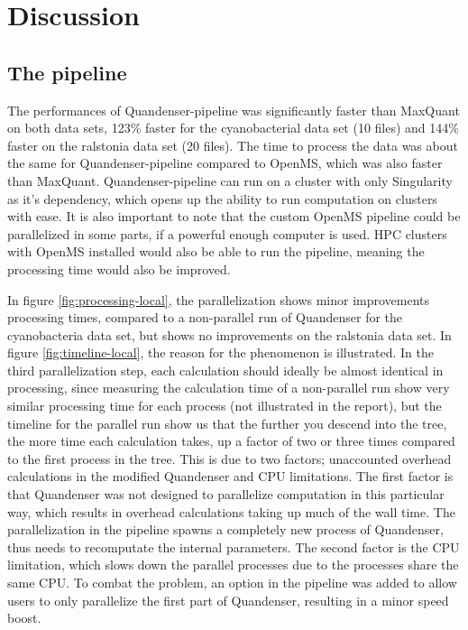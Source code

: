 \section{Discussion}

\subsection{The pipeline}
The performances of Quandenser-pipeline was significantly faster than MaxQuant on both data sets, 123\% faster for the cyanobacterial data set (10 files) and 144\% faster on the ralstonia data set (20 files). The time to process the data was about the same for Quandenser-pipeline compared to OpenMS, which was also faster than MaxQuant. Quandenser-pipeline can run on a cluster with only Singularity as it's dependency, which opens up the ability to run computation on clusters with ease. It is also important to note that the custom OpenMS pipeline could be parallelized in some parts, if a powerful enough computer is used. HPC clusters with OpenMS installed would also be able to run the pipeline, meaning the processing time would also be improved.

In figure \ref{fig:processing-local}, the parallelization shows minor improvements processing times, compared to a non-parallel run of Quandenser for the cyanobacteria data set, but shows no improvements on the ralstonia data set. In figure \ref{fig:timeline-local}, the reason for the phenomenon is illustrated. In the third parallelization step, each calculation should ideally be almost identical in processing, since measuring the calculation time of a non-parallel run show very similar processing time for each process (not illustrated in the report), but the timeline for the parallel run show us that the further you descend into the tree, the more time each calculation takes, up a factor of two or three times compared to the first process in the tree. This is due to two factors; unaccounted overhead calculations in the modified Quandenser and CPU limitations. The first factor is that Quandenser was not designed to parallelize computation in this particular way, which results in overhead calculations taking up much of the wall time. The parallelization in the pipeline spawns a completely new process of Quandenser, thus needs to recomputate the internal parameters. The second factor is the CPU limitation, which slows down the parallel processes due to the processes share the same CPU. To combat the problem, an option in the pipeline was added to allow users to only parallelize the first part of Quandenser, resulting in a minor speed boost.

